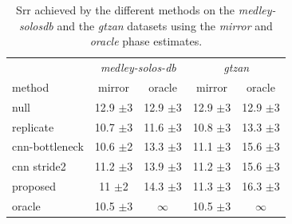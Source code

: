 \documentclass{article}
\newcommand{\ml}[1]{\textcolor{blue}{ML : #1}}
\begin{document}

\begin{table}
  \caption{Srr achieved by the different methods on the \textit{medley-solosdb} and the \textit{gtzan} datasets using the \textit{mirror} and \textit{oracle} phase estimates.}
  \label{tab:srr}
  \begin{center}
\begin{tabular}{lcc|cc}
  & \multicolumn{2}{c|}{\textit{medley-solos-db}} & \multicolumn{2}{c}{\textit{gtzan}} \\
  method & mirror & oracle & mirror & oracle \\
\hline
null & 12.9 $\pm$3 & 12.9 $\pm$3 & 12.9 $\pm$3 &  12.9 $\pm$3\\
replicate & 10.7 $\pm$3 & 11.6 $\pm$3 & 10.8 $\pm$3 & 13.3 $\pm$3\\
\hline
cnn-bottleneck & 10.6 $\pm$2 &  13.3 $\pm$3 & 11.1 $\pm$3 & 15.6 $\pm$3 \\
cnn stride2 & 11.2 $\pm$3 & 13.9 $\pm$3 & 11.2 $\pm$3 & 15.6 $\pm$3 \\
\hline
proposed  & 11 $\pm$2 & 14.3 $\pm$3  & 11.3 $\pm$3 & 16.3 $\pm$3 \\
\hline
oracle & 10.5 $\pm$3 & $\infty$ & 10.5 $\pm$3 & $\infty$ \\
\end{tabular}
\end{center}
\vspace{-4mm}
\end{table}

\end{document}
